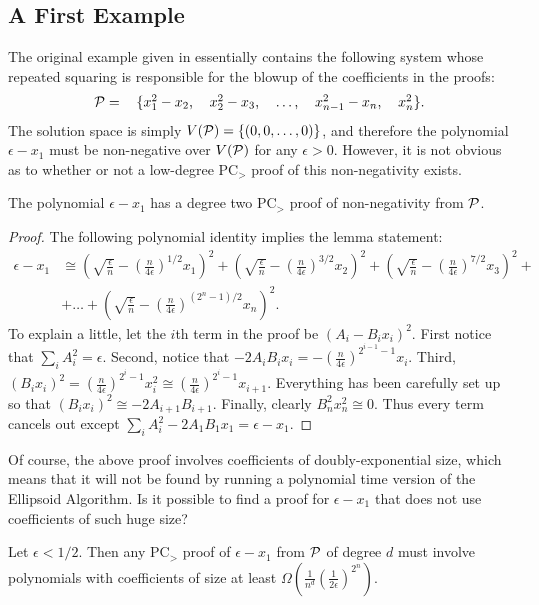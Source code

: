 \subsection{A First Example}
The original example given in \cite{ODon16} essentially contains the following system whose repeated squaring is responsible for the blowup of the coefficients in the proofs:
\[\begin{tabular}{cccccc}
$\cP = $ & $\{x_1^2 - x_2$, & $x_2^2 - x_3$, & $\dots$, & $x_{n-1}^2 - x_n$, & $x_n^2\}$.
\end{tabular}\]
The solution space is simply $V(\mathcal P) = \{(0,0,\dots,0)\}$, and therefore the polynomial $\epsilon - x_1$ must be non-negative over $V(\mathcal P)$ for any $\epsilon > 0$. However, it is not obvious as to whether or not a low-degree PC$_>$ proof of this non-negativity exists.
\begin{lemma}
The polynomial $\epsilon - x_1$ has a degree two PC$_>$ proof of non-negativity from $\mathcal P$.
\end{lemma}
\begin{proof}
The following polynomial identity implies the lemma statement:
\begin{align}
\epsilon - x_1 &\cong\left(\sqrt{\frac{\epsilon}{n}} - \left(\frac{n}{4\epsilon}\right)^{1/2}x_1\right)^2 + \left(\sqrt{\frac{\epsilon}{n}} - \left(\frac{n}{4\epsilon}\right)^{3/2}x_2\right)^2 + \left(\sqrt{\frac{\epsilon}{n}} - \left(\frac{n}{4\epsilon}\right)^{7/2}x_3\right)^2 + \nonumber\\
&+\dots + \left(\sqrt{\frac{\epsilon}{n}} - \left(\frac{n}{4\epsilon}\right)^{(2^n-1)/2}x_n\right)^2.\label{eq:proof}\tag{$*$}
\end{align}
To explain a little, let the $i$th term in the proof be $(A_i - B_ix_i)^2$. First notice that $\sum_i A_i^2 = \epsilon$. Second, notice that $-2A_iB_ix_i = -\left(\frac{n}{4\epsilon}\right)^{2^{i-1}-1}x_i$. Third, $(B_ix_i)^2 = \left(\frac{n}{4\epsilon}\right)^{2^i-1}x_i^2 \cong \left(\frac{n}{4\epsilon}\right)^{2^i-1}x_{i+1}$. Everything has been carefully set up so that $(B_ix_i)^2 \cong -2A_{i+1}B_{i+1}$. Finally, clearly $B_n^2x_n^2 \cong 0$. Thus every term cancels out except $\sum_i A_i^2-2A_1B_1x_1 = \epsilon-x_1$. 
\end{proof}
%
Of course, the above proof involves coefficients of doubly-exponential size, which means that it will not be found by running a polynomial time version of the Ellipsoid Algorithm. Is it possible to find a proof for $\epsilon - x_1$ that does not use coefficients of such huge size?
\begin{lemma}\label{lem:nonbool-complex}
Let $\epsilon < 1/2$. Then any PC$_>$ proof of $\epsilon - x_1$ from $\mathcal P$ of degree $d$ must involve polynomials with coefficients of size at least $\Omega\left(\frac{1}{n^d}\left(\frac{1}{2\epsilon}\right)^{2^n}\right)$.
\end{lemma}
